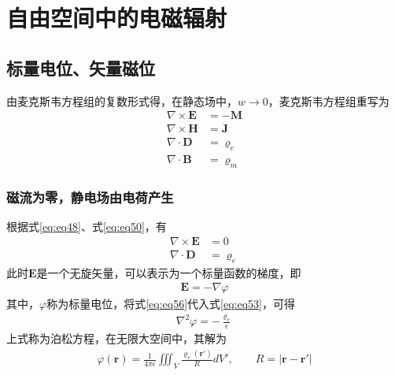 \documentclass{article}
\numberwithin{equation}{section}
\renewcommand{\vec}[1]{\boldsymbol{#1}}
\begin{document}
\section{\textsf{自由空间中的电磁辐射}}
\subsection{标量电位、矢量磁位}
由麦克斯韦方程组的复数形式得，在静态场中，$w \to 0$，麦克斯韦方程组重写为
\begin{align}
    \label{eq:eq48}
    \nabla \times \mathbf{E}&=-\mathbf{M} \\
    \label{eq:eq49}
    \nabla \times \mathbf{H}&=\mathbf{J} \\
    \label{eq:eq50}
    \nabla \cdot \mathbf{D}&=\varrho _{e} \\
    \label{eq:eq51}
    \nabla \cdot \mathbf{B}&=\varrho _{m}
\end{align}
\subsubsection{磁流为零，静电场由电荷产生}
根据式\ref{eq:eq48}、式\ref{eq:eq50}，有
\begin{align}
    \label{eq:eq52}
    \nabla \times \mathbf{E}&=0 \\
    \label{eq:eq53}
    \nabla \cdot \mathbf{D}&=\varrho _{e}
\end{align}
此时$\mathbf{E}$是一个无旋矢量，可以表示为一个标量函数的梯度，即
\begin{align}
    \label{eq:eq56}
    \mathbf{E}=-\nabla \varphi
\end{align}
其中，$\varphi$称为标量电位，将式\ref{eq:eq56}代入式\ref{eq:eq53}，可得
\begin{align}
    \label{eq:eq58}
    \nabla^2\varphi =-\frac{\varrho _{e}}{\epsilon}
\end{align}
上式称为泊松方程，在无限大空间中，其解为
\begin{align}
    \label{eq:eq60}
    \varphi(\vec{r})=\frac{1}{4\pi \epsilon}\iiint_V\frac{\varrho _e(\vec{r}')}{R}dV',\qquad R=|\vec{r}-\vec{r}'|
\end{align}
\end{document}
